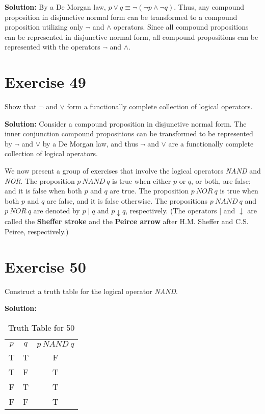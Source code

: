 \documentclass{Axon}
\begin{document}
\noindent
\textbf{Solution:}
By a De Morgan law, \(p \lor q \equiv \lnot( \lnot p \land \lnot q)\). Thus, any compound proposition in disjunctive normal form can be transformed to a compound proposition utilizing only \(\lnot\) and \(\land\) operators. Since all compound propositions can be represented in disjunctive normal form, all compound propositions can be represented with the operators \(\lnot\) and \(\land\).

\section*{Exercise 49}
Show that \(\lnot\) and \(\lor\) form a functionally complete collection of logical operators.

\noindent
\textbf{Solution:}
Consider a compound proposition in disjunctive normal form. The inner conjunction compound propositions can be transformed to be represented by \(\lnot\) and \(\lor\) by a De Morgan law, and thus \(\lnot\) and \(\lor\) are a functionally complete collection of logical operators.

We now present a group of exercises that involve the logical operators \textit{NAND} and \textit{NOR}. The proposition \(p \ \textit{NAND} \ q\) is true when either \(p\) or \(q\), or both, are false; and it is false when both \(p\) and \(q\) are true. The proposition \(p \ \textit{NOR} \ q\) is true when both \(p\) and \(q\) are false, and it is false otherwise. The propositions \(p \ \textit{NAND} \ q\) and \(p \ \textit{NOR} \ q\) are denoted by \(p \mathbin{\mid} q\) and \(p \downarrow q\), respectively. (The operators \(\mathbin{\mid}\) and \(\downarrow\) are called the \textbf{Sheffer stroke} and the \textbf{Peirce arrow} after H.M. Sheffer and C.S. Peirce, respectively.)

\section*{Exercise 50}
Construct a truth table for the logical operator \textit{NAND}.

\noindent
\textbf{Solution:}
\begin{table}[ht]
    \centering
    \begin{tabular}{c|c|c}
        \(p\) & \(q\) & \(p \ \textit{NAND} \ q\) \\
        T     & T     & F                         \\
        T     & F     & T                         \\
        F     & T     & T                         \\
        F     & F     & T
    \end{tabular}
    \caption{Truth Table for 50}
\end{table}
\end{document}
